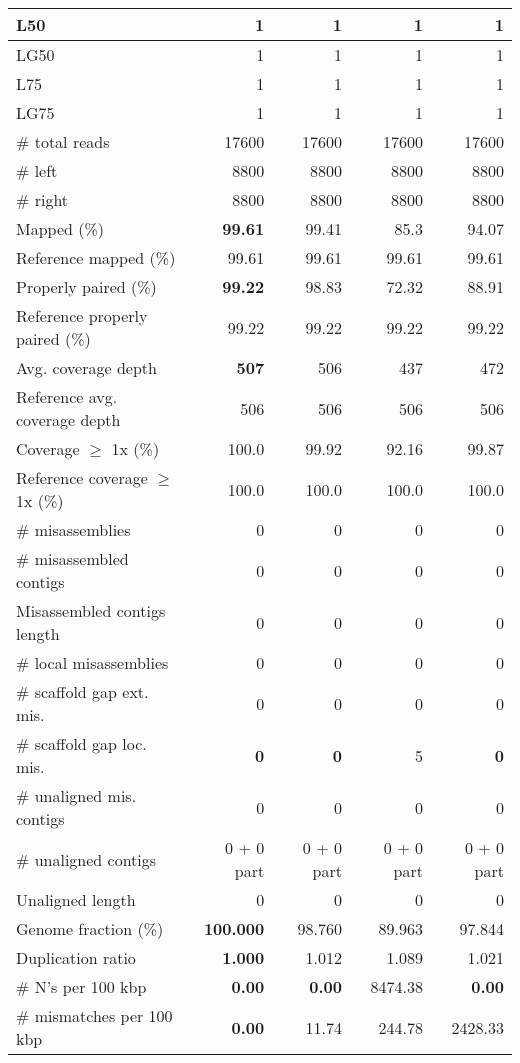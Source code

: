 \documentclass[12pt,a4paper]{article}
\begin{document}
\begin{table}[ht]
\begin{center}
\begin{tabular}{|l*{4}{|r}|}
L50 & 1 & 1 & 1 & 1 \\ \hline
LG50 & 1 & 1 & 1 & 1 \\ \hline
L75 & 1 & 1 & 1 & 1 \\ \hline
LG75 & 1 & 1 & 1 & 1 \\ \hline
\# total reads & 17600 & 17600 & 17600 & 17600 \\ \hline
\# left & 8800 & 8800 & 8800 & 8800 \\ \hline
\# right & 8800 & 8800 & 8800 & 8800 \\ \hline
Mapped (\%) & {\bf 99.61} & 99.41 & 85.3 & 94.07 \\ \hline
Reference mapped (\%) & 99.61 & 99.61 & 99.61 & 99.61 \\ \hline
Properly paired (\%) & {\bf 99.22} & 98.83 & 72.32 & 88.91 \\ \hline
Reference properly paired (\%) & 99.22 & 99.22 & 99.22 & 99.22 \\ \hline
Avg. coverage depth & {\bf 507} & 506 & 437 & 472 \\ \hline
Reference avg. coverage depth & 506 & 506 & 506 & 506 \\ \hline
Coverage $\geq$ 1x (\%) & 100.0 & 99.92 & 92.16 & 99.87 \\ \hline
Reference coverage $\geq$ 1x (\%) & 100.0 & 100.0 & 100.0 & 100.0 \\ \hline
\# misassemblies & 0 & 0 & 0 & 0 \\ \hline
\# misassembled contigs & 0 & 0 & 0 & 0 \\ \hline
Misassembled contigs length & 0 & 0 & 0 & 0 \\ \hline
\# local misassemblies & 0 & 0 & 0 & 0 \\ \hline
\# scaffold gap ext. mis. & 0 & 0 & 0 & 0 \\ \hline
\# scaffold gap loc. mis. & {\bf 0} & {\bf 0} & 5 & {\bf 0} \\ \hline
\# unaligned mis. contigs & 0 & 0 & 0 & 0 \\ \hline
\# unaligned contigs & 0 + 0 part & 0 + 0 part & 0 + 0 part & 0 + 0 part \\ \hline
Unaligned length & 0 & 0 & 0 & 0 \\ \hline
Genome fraction (\%) & {\bf 100.000} & 98.760 & 89.963 & 97.844 \\ \hline
Duplication ratio & {\bf 1.000} & 1.012 & 1.089 & 1.021 \\ \hline
\# N's per 100 kbp & {\bf 0.00} & {\bf 0.00} & 8474.38 & {\bf 0.00} \\ \hline
\# mismatches per 100 kbp & {\bf 0.00} & 11.74 & 244.78 & 2428.33 \\ \hline

\end{tabular}
\end{center}
\end{table}
\end{document}
